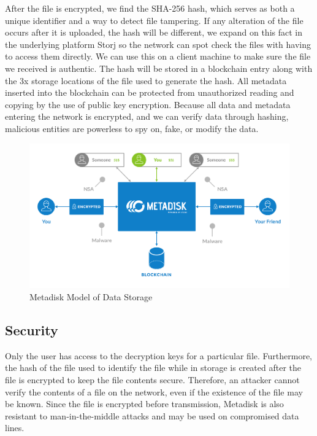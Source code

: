 \documentclass[a4paper,12pt]{article}
\begin{document}
After the file is encrypted, we find the SHA-256 hash, which serves as both a unique identifier and a way to detect file tampering.  If any alteration of the file occurs after it is uploaded, the hash will be different, we expand on this fact in the underlying platform Storj \cite{7} so the network can spot check the files with having to access them directly. We can use this on a client machine to make sure the file we received is authentic. The hash will be stored in a blockchain entry along with the 3x storage locations of the file used to generate the hash.  All metadata inserted into the blockchain can be protected from unauthorized reading and copying by the use of public key encryption.  Because all data and metadata entering the network is encrypted, and we can verify data through hashing, malicious entities are powerless to spy on, fake, or modify the data.

\begin{figure}[h!]
  \centering
      \includegraphics[width=\linewidth]{02}
  \caption{Metadisk Model of Data Storage}
\end{figure}

\subsection*{Security}

Only the user has access to the decryption keys for a particular file. Furthermore, the hash of the file used to identify the file while in storage is created after the file is encrypted to keep the file contents secure. Therefore, an attacker cannot verify the contents of a file on the network, even if the existence of the file may be known. Since the file is encrypted before transmission, Metadisk is also resistant to man-in-the-middle attacks and may be used on compromised data lines.   \\
\end{document}
